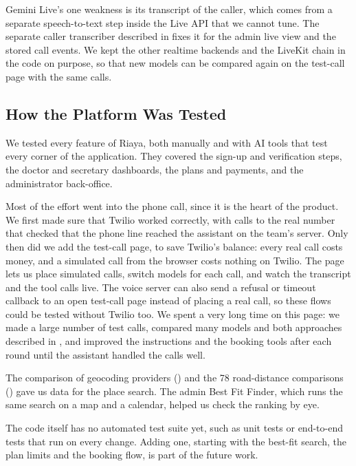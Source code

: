 Gemini Live's one weakness is its transcript of the caller, which comes from a separate speech-to-text step inside the Live API that we cannot tune. The separate caller transcriber described in  fixes it for the admin live view and the stored call events. We kept the other realtime backends and the LiveKit chain in the code on purpose, so that new models can be compared again on the test-call page with the same calls.

\subsection{How the Platform Was Tested}

We tested every feature of Riaya, both manually and with AI tools that test every corner of the application. They covered the sign-up and verification steps, the doctor and secretary dashboards, the plans and payments, and the administrator back-office.

Most of the effort went into the phone call, since it is the heart of the product. We first made sure that Twilio worked correctly, with calls to the real number that checked that the phone line reached the assistant on the team's server. Only then did we add the test-call page, to save Twilio's balance: every real call costs money, and a simulated call from the browser costs nothing on Twilio. The page lets us place simulated calls, switch models for each call, and watch the transcript and the tool calls live. The voice server can also send a refusal or timeout callback to an open test-call page instead of placing a real call, so these flows could be tested without Twilio too. We spent a very long time on this page: we made a large number of test calls, compared many models and both approaches described in , and improved the instructions and the booking tools after each round until the assistant handled the calls well.

The comparison of geocoding providers () and the 78 road-distance comparisons () gave us data for the place search. The admin Best Fit Finder, which runs the same search on a map and a calendar, helped us check the ranking by eye.

The code itself has no automated test suite yet, such as unit tests or end-to-end tests that run on every change. Adding one, starting with the best-fit search, the plan limits and the booking flow, is part of the future work.

